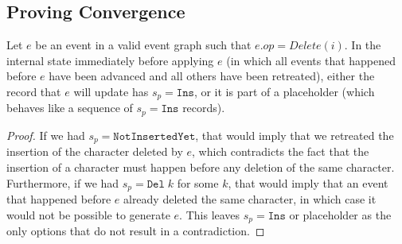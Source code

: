 \documentclass[sigplan,10pt]{acmart}
\begin{document}
\subsection{Proving Convergence}

\begin{lemma}\label{lemma-prepare-delete}
  Let $e$ be an event in a valid event graph such that $e.\mathit{op} = \mathit{Delete}(i)$.
  In the internal state immediately before applying $e$ (in which all events that happened before $e$ have been advanced and all others have been retreated), either the record that $e$ will update has $s_p = \texttt{Ins}$, or it is part of a placeholder (which behaves like a sequence of $s_p = \texttt{Ins}$ records).
\end{lemma}
\begin{proof}
  If we had $s_p = \texttt{NotInsertedYet}$, that would imply that we retreated the insertion of the character deleted by $e$, which contradicts the fact that the insertion of a character must happen before any deletion of the same character.
  Furthermore, if we had $s_p = \texttt{Del}\; k$ for some $k$, that would imply that an event that happened before $e$ already deleted the same character, in which case it would not be possible to generate $e$.
  This leaves $s_p = \texttt{Ins}$ or placeholder as the only options that do not result in a contradiction.
\end{proof}
\end{document}

